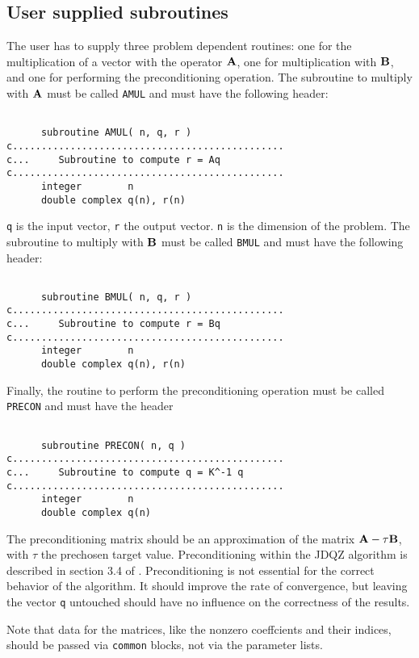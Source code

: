\documentclass[12pt,a4paper]{article}
\def\BA{{\bf A}}\def\BB{{\bf B}}
\begin{document}
\subsection{User supplied subroutines}
The user has to supply three problem dependent routines: one for the
multiplication of a vector with the operator $\BA$, one for multiplication
with $\BB$, and one for performing the preconditioning operation. The
subroutine to multiply with $\BA$ must be called {\tt AMUL} and must have the
following header:
\begin{verbatim}

      subroutine AMUL( n, q, r )
c...............................................
c...     Subroutine to compute r = Aq
c...............................................
      integer        n
      double complex q(n), r(n)

\end{verbatim}
{\tt q} is the input vector, {\tt r} the output vector. {\tt n} is the 
dimension of the problem. The
subroutine to multiply with $\BB$ must be called {\tt BMUL} and must have the
following header:
\begin{verbatim}

      subroutine BMUL( n, q, r )
c...............................................
c...     Subroutine to compute r = Bq
c...............................................
      integer        n
      double complex q(n), r(n)

\end{verbatim}
Finally, the routine to perform the preconditioning operation must be
called {\tt PRECON} and must have the header
\begin{verbatim}

      subroutine PRECON( n, q )
c...............................................
c...     Subroutine to compute q = K^-1 q
c...............................................
      integer        n
      double complex q(n)

\end{verbatim}
The preconditioning matrix should be an approximation of the matrix
$\BA - \tau \BB$, with $\tau$ the prechosen target value. Preconditioning 
within the JDQZ algorithm is described in section 3.4 of \cite{jdqz}.
Preconditioning is not essential for the correct behavior of the algorithm.
It should improve the rate of convergence, but leaving the vector {\tt q}
untouched should have no influence on the correctness of the results.

Note that data for the matrices, 
like the nonzero coeffcients and their indices, should be passed via 
{\tt common} blocks, not via the parameter lists. 
\newpage
\end{document}
